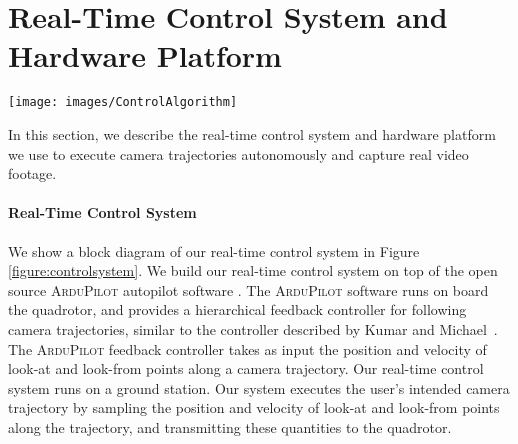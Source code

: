 \section{Real-Time Control System and Hardware Platform}\label{section:hw}

\begin{figure*}[th!]
  \centering
  \texttt{[image: images/ControlAlgorithm]}
  \caption{
Block diagram of our real-time control system for executing camera trajectories.
On a ground station (left), our trajectory follower (white) samples the camera trajectory, transmitting the sampled position and velocity of look-at and look-from points to the quadrotor.
Our trajectory follower allows the user to optionally adjust a time scaling factor, to execute the trajectory faster or slower.
On board the quadrotor (right), the higher-level look-from and look-at position controllers interface with a lower-level attitude controller (yellow) and motor controller (green), similar to those described by Kumar and Michael~\protect{}.
}
\label{figure:controlsystem}
\end{figure*}

In this section, we describe the real-time control system and hardware platform we use to execute camera trajectories autonomously and capture real video footage.

\paragraph{Real-Time Control System}
We show a block diagram of our real-time control system in Figure \ref{figure:controlsystem}.
We build our real-time control system on top of the open source \textsc{ArduPilot} autopilot software \cite{apm:2015}. 
The \textsc{ArduPilot} software runs on board the quadrotor, and provides a hierarchical feedback controller for following camera trajectories, similar to the controller described by Kumar and Michael~. 
The \textsc{ArduPilot} feedback controller takes as input the position and velocity of look-at and look-from points along a camera trajectory.
Our real-time control system runs on a ground station.
Our system executes the user's intended camera trajectory by sampling the position and velocity of look-at and look-from points along the trajectory, and transmitting these quantities to the quadrotor.

